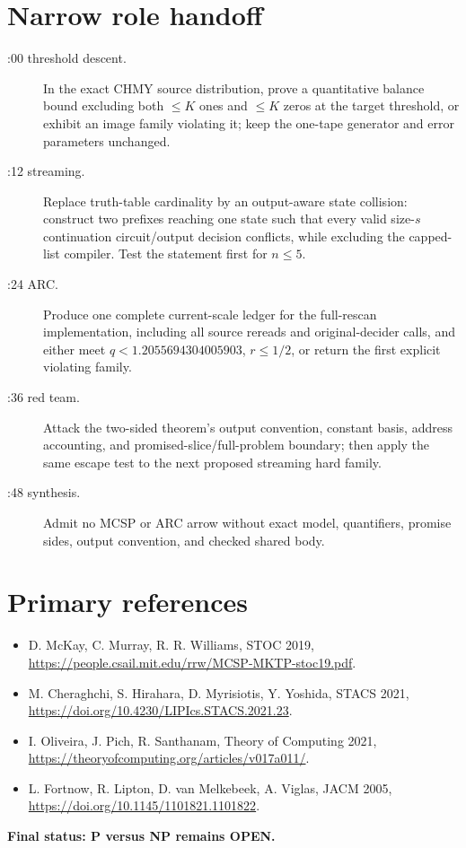 \documentclass[11pt]{article}
\begin{document}
\section*{Narrow role handoff}
\begin{description}
\item[:00 threshold descent.] In the exact CHMY source distribution, prove a
quantitative balance bound excluding both $\le K$ ones and $\le K$ zeros at
the target threshold, or exhibit an image family violating it; keep the
one-tape generator and error parameters unchanged.
\item[:12 streaming.] Replace truth-table cardinality by an output-aware
state collision: construct two prefixes reaching one state such that every
valid size-$s$ continuation circuit/output decision conflicts, while excluding
the capped-list compiler.  Test the statement first for $n\le5$.
\item[:24 ARC.] Produce one complete current-scale ledger for the full-rescan
implementation, including all source rereads and original-decider calls, and
either meet $q<1.2055694304005903$, $r\le1/2$, or return the first explicit
violating family.
\item[:36 red team.] Attack the two-sided theorem's output convention,
constant basis, address accounting, and promised-slice/full-problem boundary;
then apply the same escape test to the next proposed streaming hard family.
\item[:48 synthesis.] Admit no MCSP or ARC arrow without exact model,
quantifiers, promise sides, output convention, and checked shared body.
\end{description}

\section*{Primary references}
\begin{itemize}
\item D. McKay, C. Murray, R. R. Williams, STOC 2019,
\url{https://people.csail.mit.edu/rrw/MCSP-MKTP-stoc19.pdf}.
\item M. Cheraghchi, S. Hirahara, D. Myrisiotis, Y. Yoshida, STACS 2021,
\url{https://doi.org/10.4230/LIPIcs.STACS.2021.23}.
\item I. Oliveira, J. Pich, R. Santhanam, Theory of Computing 2021,
\url{https://theoryofcomputing.org/articles/v017a011/}.
\item L. Fortnow, R. Lipton, D. van Melkebeek, A. Viglas, JACM 2005,
\url{https://doi.org/10.1145/1101821.1101822}.
\end{itemize}

\noindent\textbf{Final status: P versus NP remains OPEN.}
\end{document}
